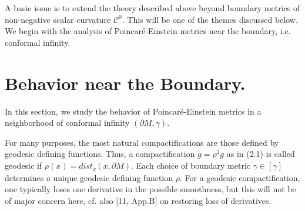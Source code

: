 \documentclass[11pt,amsfonts]{amsart}
\begin{document}
\medskip

 A basic issue is to extend the theory described above beyond boundary 
metrics of non-negative scalar curvature ${\mathcal C}^{0}$. This will be 
one of the themes discussed below. We begin with the analysis of 
Poincar\'e-Einstein metrics near the boundary, i.e. conformal infinity. 


\section{Behavior near the Boundary.}
\setcounter{equation}{0}


 In this section, we study the behavior of Poincar\'e-Einstein metrics in 
a neighborhood of conformal infinity $(\partial M, \gamma)$. 

 For many purposes, the most natural compactifications are those 
defined by geodesic defining functions. Thus, a compactification 
$\bar g = \rho^{2}g$ as in (2.1) is called geodesic if $\rho (x) = 
dist_{\bar g}(x, \partial M)$. Each choice of boundary metric 
$\gamma \in [\gamma]$ determines a unique geodesic defining function 
$\rho$. For a geodesic compactification, one typically loses one 
derivative in the possible smoothness, but this will not be of major 
concern here, cf. also [11, App.B] on restoring loss of derivatives. 
\end{document}
